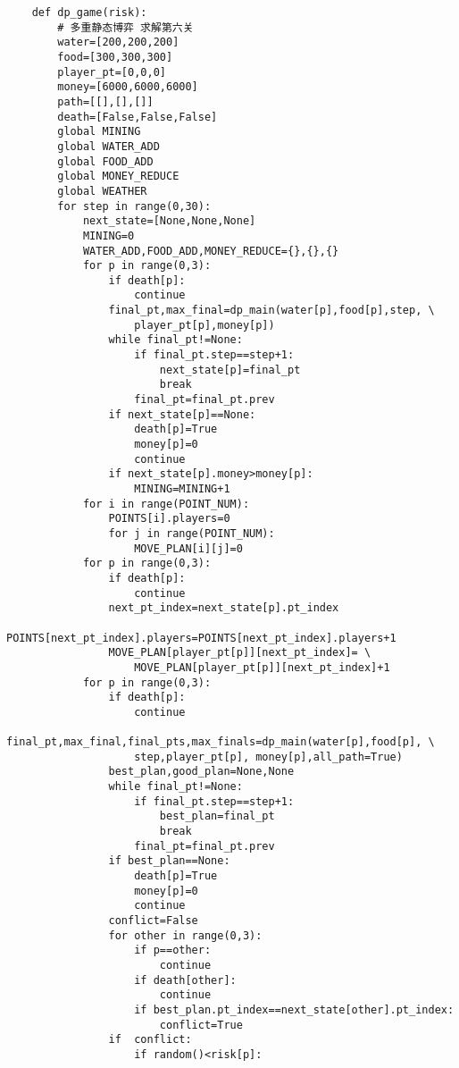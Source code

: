 \documentclass[bwprint]{cumcmthesis} %
\begin{document}
\begin{appendices}
\begin{lstlisting}
    def dp_game(risk):
        # 多重静态博弈 求解第六关
        water=[200,200,200]
        food=[300,300,300]
        player_pt=[0,0,0]
        money=[6000,6000,6000]
        path=[[],[],[]]
        death=[False,False,False]
        global MINING
        global WATER_ADD
        global FOOD_ADD
        global MONEY_REDUCE
        global WEATHER
        for step in range(0,30):
            next_state=[None,None,None]
            MINING=0
            WATER_ADD,FOOD_ADD,MONEY_REDUCE={},{},{}
            for p in range(0,3):
                if death[p]:
                    continue
                final_pt,max_final=dp_main(water[p],food[p],step, \
                    player_pt[p],money[p])
                while final_pt!=None:
                    if final_pt.step==step+1:
                        next_state[p]=final_pt
                        break
                    final_pt=final_pt.prev
                if next_state[p]==None:
                    death[p]=True
                    money[p]=0
                    continue
                if next_state[p].money>money[p]:
                    MINING=MINING+1
            for i in range(POINT_NUM):
                POINTS[i].players=0
                for j in range(POINT_NUM):
                    MOVE_PLAN[i][j]=0
            for p in range(0,3):
                if death[p]:
                    continue
                next_pt_index=next_state[p].pt_index
                POINTS[next_pt_index].players=POINTS[next_pt_index].players+1
                MOVE_PLAN[player_pt[p]][next_pt_index]= \
                    MOVE_PLAN[player_pt[p]][next_pt_index]+1
            for p in range(0,3):
                if death[p]:
                    continue
                final_pt,max_final,final_pts,max_finals=dp_main(water[p],food[p], \
                    step,player_pt[p], money[p],all_path=True)
                best_plan,good_plan=None,None
                while final_pt!=None:
                    if final_pt.step==step+1:
                        best_plan=final_pt
                        break
                    final_pt=final_pt.prev
                if best_plan==None:
                    death[p]=True
                    money[p]=0
                    continue
                conflict=False
                for other in range(0,3):
                    if p==other:
                        continue
                    if death[other]:
                        continue
                    if best_plan.pt_index==next_state[other].pt_index:
                        conflict=True
                if  conflict:
                    if random()<risk[p]:

\end{lstlisting}
\end{appendices}
\end{document}
